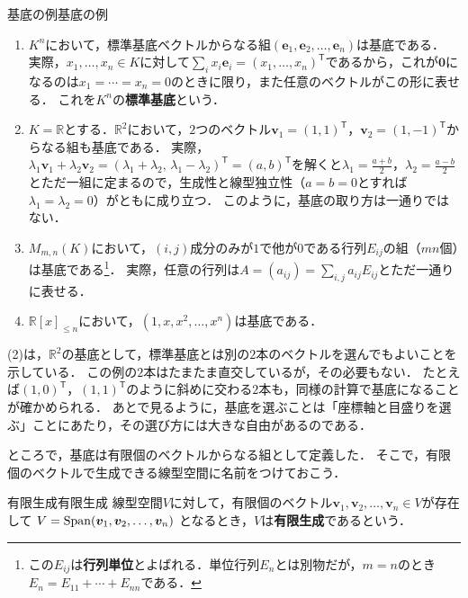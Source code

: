 \begin{example}{基底の例}{基底の例}
  \begin{enumerate}[label=(\arabic*),leftmargin=3.2em]
    \item $K^n$において，標準基底ベクトルからなる組$(\bm{e}_1, \bm{e}_2, \dots, \bm{e}_n)$は基底である．
    実際，$x_1, \dots, x_n \in K$に対して$\sum_i x_i\bm{e}_i=(x_1,\dots,x_n)^\mathsf{T}$であるから，これが$\bm{0}$になるのは$x_1=\cdots=x_n=0$のときに限り，また任意のベクトルがこの形に表せる．
    これを$K^n$の\textbf{標準基底}という．

    \item $K=\mathbb{R}$とする．$\mathbb{R}^2$において，$2$つのベクトル$\bm{v}_1 = (1,1)^\mathsf{T}$，$\bm{v}_2 = (1,-1)^\mathsf{T}$からなる組も基底である．
    実際，$\lambda_1\bm{v}_1+\lambda_2\bm{v}_2=(\lambda_1+\lambda_2,\,\lambda_1-\lambda_2)^\mathsf{T}=(a,b)^\mathsf{T}$を解くと$\lambda_1=\frac{a+b}{2}$，$\lambda_2=\frac{a-b}{2}$とただ一組に定まるので，生成性と線型独立性（$a=b=0$とすれば$\lambda_1=\lambda_2=0$）がともに成り立つ．
    このように，基底の取り方は一通りではない．

    \item $M_{m,n}(K)$において，$(i,j)$成分のみが$1$で他が$0$である行列$E_{ij}$の組（$mn$個）は基底である\footnote{この$E_{ij}$は\textbf{行列単位}とよばれる．単位行列$E_n$とは別物だが，$m=n$のとき$E_n = E_{11} + \cdots + E_{nn}$である．}．
    実際，任意の行列は$A=(a_{ij})=\sum_{i,j}a_{ij}E_{ij}$とただ一通りに表せる．

    \item $\mathbb{R}[x]_{\le n}$において，$(1, x, x^2, \dots, x^n)$は基底である．
  \end{enumerate}
\end{example}

(2)は，$\mathbb{R}^2$の基底として，標準基底とは別の$2$本のベクトルを選んでもよいことを示している．
この例の$2$本はたまたま直交しているが，その必要もない．
たとえば$(1,0)^\mathsf{T}$，$(1,1)^\mathsf{T}$のように斜めに交わる$2$本も，同様の計算で基底になることが確かめられる．
あとで見るように，基底を選ぶことは「座標軸と目盛りを選ぶ」ことにあたり，その選び方には大きな自由があるのである．

ところで，基底は有限個のベクトルからなる組として定義した．
そこで，有限個のベクトルで生成できる線型空間に名前をつけておこう．

\begin{definition}{有限生成}{有限生成}
  線型空間$V$に対して，有限個のベクトル$\bm{v}_1, \bm{v}_2, \dots, \bm{v}_n \in V$が存在して
  $V = \operatorname{Span}(\bm{v}_1, \bm{v}_2, \dots, \bm{v}_n)$
  となるとき，$V$は\textbf{有限生成}であるという．
\end{definition}

